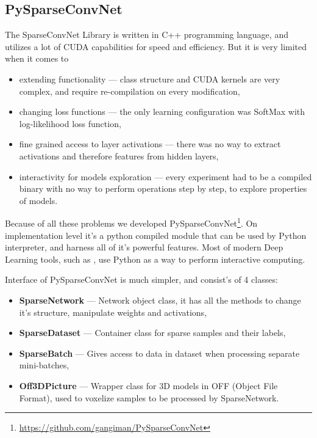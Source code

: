 \subsection{PySparseConvNet}

The SparseConvNet Library is written in C++ programming language, and utilizes a lot of CUDA capabilities for speed and efficiency. But it is very limited when it comes to 
\begin{itemize}
\item extending functionality --- class structure and CUDA kernels are very complex, and require re-compilation on every modification,
\item changing loss functions --- the only learning configuration was SoftMax with log-likelihood loss function,
\item fine grained access to layer activations --- there was no way to extract activations and therefore features from hidden layers,
\item interactivity for models exploration --- every experiment had to be a compiled binary with no way to perform operations step by step, to explore properties of models.
\end{itemize}

Because of all these problems we developed PySparseConvNet\footnote{\url{https://github.com/gangiman/PySparseConvNet}}.
On implementation level it's a python compiled module that can be used by Python interpreter, and harness all of it's powerful features. Most of modern Deep Learning tools, such as \cite{2016arXiv160502688short,tensorflow2015-whitepaper,tokui2015chainer}, use Python as a way to perform interactive computing.

Interface of PySparseConvNet is much simpler, and consist's of 4 classes:

\begin{itemize}
\item \textbf{SparseNetwork} --- Network object class, it has all the methods to change it's structure, manipulate weights and activations,
\item \textbf{SparseDataset} --- Container class for sparse samples and their labels,
\item \textbf{SparseBatch} --- Gives access to data in dataset when processing separate mini-batches,
\item \textbf{Off3DPicture} --- Wrapper class for 3D models in OFF (Object File Format), used to voxelize samples to be processed by SparseNetwork.
\end{itemize}

